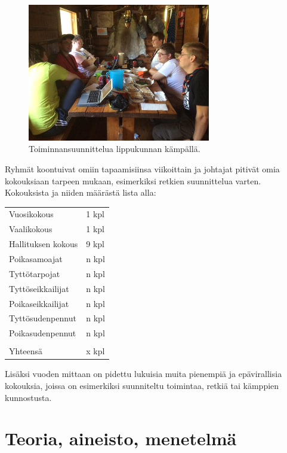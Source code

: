 \documentclass[a4paper, 12pt, finnish]{report} %
\begin{document}
\begin{figure}[htb]
	\begin{center}
	\includegraphics[height=6cm]{kokous.jpg}
	\end{center}
	\caption{Toiminnansuunnittelua lippukunnan kämpällä.}
\end{figure}


Ryhmät koontuivat omiin tapaamisiinsa viikoittain ja johtajat pitivät omia kokouksiaan tarpeen mukaan, esimerkiksi retkien suunnittelua varten. Kokouksista ja niiden määrästä lista alla:\\
\begin{center}
\begin{tabular}{ l l }
	Vuosikokous & 1 kpl\\
	Vaalikokous & 1 kpl\\
	Hallituksen kokous & 9 kpl\\
	Poikasamoajat & n kpl\\
	Tyttötarpojat & n kpl\\
	Tyttöseikkailijat & n kpl\\
	Poikaseikkailijat & n kpl\\
	Tyttösudenpennut & n kpl\\
	Poikasudenpennut & n kpl\\
			 & \\
	Yhteensä & x kpl\\
\end{tabular}
\end{center}
Lisäksi vuoden mittaan on pidettu lukuisia muita pienempiä ja epävirallisia kokouksia, joissa on esimerkiksi suunniteltu toimintaa, retkiä tai kämppien kunnostusta.
\section{Teoria, aineisto, menetelmä}
\end{document}
